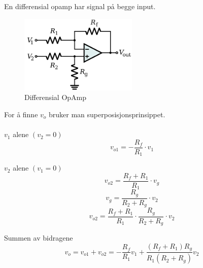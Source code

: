 En differensial opamp har signal på begge input.

\begin{figure}[H]
  \caption{Differensial OpAmp}
  \centering
  \includegraphics[width=0.5\textwidth]{./img/diffamp}
\end{figure}

For å finne $v_o$ bruker man superposisjonsprinsippet.
\\\\
$v_1$ alene $(v_2 = 0)$
$$v_{o1} = -\frac{R_f}{R_1} \cdot v_1$$

$v_2$ alene $(v_1 = 0)$
$$v_{o2} = \frac{R_f + R_1}{R_1} \cdot v_g$$
$$v_g = \frac{R_g}{R_2 + R_g} \cdot v_2$$
$$v_{o2} = \frac{R_f+R_1}{R_1} \cdot \frac{R_g}{R_2+R_g} \cdot v_2$$

Summen av bidragene
$$v_o = v_{o1} + v_{o2} =
  -\frac{R_f}{R_1}v_1 + \frac{(R_f+R_1)R_g}{R_1(R_2+R_g)}v_2$$
